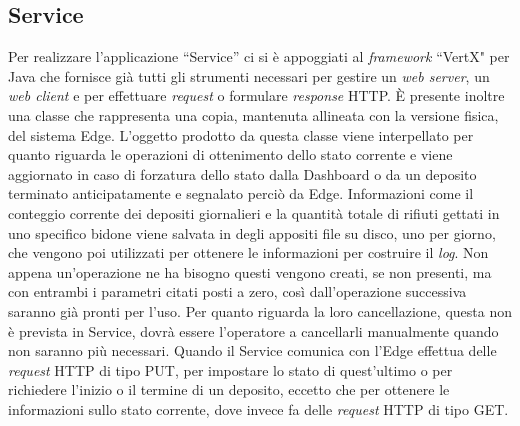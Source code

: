 \documentclass[a4paper, 12pt]{report}
\begin{document}
			\subsection{Service}
			Per realizzare l'applicazione ``Service'' ci si è appoggiati al \textit{framework} ``VertX" per Java
			che fornisce già tutti gli strumenti necessari per gestire un \textit{web server}, un
			\textit{web client} e per effettuare \textit{request} o formulare \textit{response} HTTP.
			È presente inoltre una classe che rappresenta una copia, mantenuta allineata con la versione fisica, del sistema Edge. L'oggetto prodotto da questa classe viene
			interpellato per quanto riguarda le operazioni di ottenimento dello stato corrente e viene
			aggiornato in caso di forzatura dello stato dalla Dashboard o da un deposito terminato
			anticipatamente e segnalato perciò da Edge. Informazioni come il conteggio corrente dei
			depositi giornalieri e la quantità totale di rifiuti gettati in uno specifico bidone
			viene salvata in degli appositi file su disco, uno per giorno, che vengono poi utilizzati
			per ottenere le informazioni per costruire il \textit{log}. Non appena un'operazione ne ha
			bisogno questi vengono creati, se non presenti, ma con entrambi i parametri citati
			posti a zero, così dall'operazione successiva saranno già pronti per l'uso. Per quanto
			riguarda la loro cancellazione, questa non è prevista in Service, dovrà essere l'operatore
			a cancellarli manualmente quando non saranno più necessari.\newline
			Quando il Service comunica con l'Edge effettua delle \textit{request} HTTP di tipo PUT,
			per impostare lo stato di quest'ultimo o per richiedere l'inizio o il termine di un deposito,
			eccetto che per ottenere le informazioni sullo stato corrente, dove invece fa delle
			\textit{request} HTTP di tipo GET.
\end{document}
